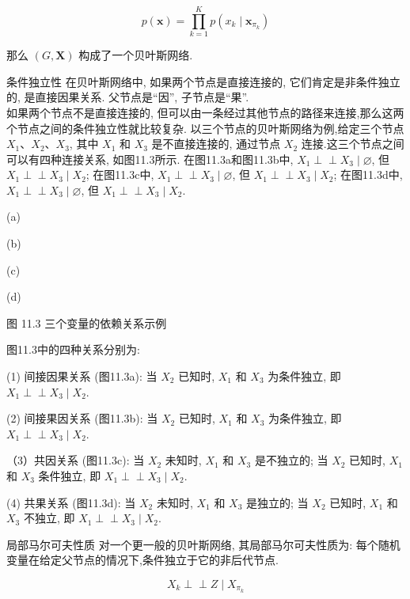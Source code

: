 \documentclass[10pt]{article}
\def\Perp{\perp\!\!\!\perp}
\begin{document}
\begin{equation*}
p(\boldsymbol{x})=\prod_{k=1}^{K} p\left(x_{k} \mid \boldsymbol{x}_{\pi_{k}}\right) \tag{11.8}
\end{equation*}


那么 $(G, \boldsymbol{X})$ 构成了一个贝叶斯网络.

条件独立性 在贝叶斯网络中, 如果两个节点是直接连接的, 它们肯定是非条件独立的, 是直接因果关系. 父节点是“因”, 子节点是“果”.\\
如果两个节点不是直接连接的, 但可以由一条经过其他节点的路径来连接,那么这两个节点之间的条件独立性就比较复杂. 以三个节点的贝叶斯网络为例,给定三个节点 $X_{1} 、 X_{2} 、 X_{3}$, 其中 $X_{1}$ 和 $X_{3}$ 是不直接连接的, 通过节点 $X_{2}$ 连接.这三个节点之间可以有四种连接关系, 如图11.3所示. 在图11.3a和图11.3b中, $X_{1} \Perp X_{3} \mid \varnothing$, 但 $X_{1} \Perp X_{3} \mid X_{2}$; 在图11.3c中, $X_{1} \Perp X_{3} \mid \varnothing$, 但 $X_{1} \Perp X_{3} \mid X_{2}$; 在图11.3d中, $X_{1} \Perp X_{3} \mid \varnothing$, 但 $X_{1} \Perp X_{3} \mid X_{2}$.



(a)



(b)



(c)



(d)

图 11.3 三个变量的依赖关系示例

图11.3中的四种关系分别为:

(1) 间接因果关系 (图11.3a): 当 $X_{2}$ 已知时, $X_{1}$ 和 $X_{3}$ 为条件独立, 即 $X_{1} \Perp X_{3} \mid X_{2}$.

(2) 间接果因关系 (图11.3b): 当 $X_{2}$ 已知时, $X_{1}$ 和 $X_{3}$ 为条件独立, 即 $X_{1} \Perp X_{3} \mid X_{2}$.

（3）共因关系 (图11.3c): 当 $X_{2}$ 未知时, $X_{1}$ 和 $X_{3}$ 是不独立的; 当 $X_{2}$ 已知时, $X_{1}$ 和 $X_{3}$ 条件独立, 即 $X_{1} \Perp X_{3} \mid X_{2}$.

(4) 共果关系 (图11.3d): 当 $X_{2}$ 未知时, $X_{1}$ 和 $X_{3}$ 是独立的; 当 $X_{2}$ 已知时, $X_{1}$ 和 $X_{3}$ 不独立, 即 $X_{1} \Perp X_{3} \mid X_{2}$.

局部马尔可夫性质 对一个更一般的贝叶斯网络, 其局部马尔可夫性质为: 每个随机变量在给定父节点的情况下,条件独立于它的非后代节点.


\begin{equation*}
X_{k} \Perp Z \mid X_{\pi_{k}} \tag{11.9}
\end{equation*}
\end{document}
